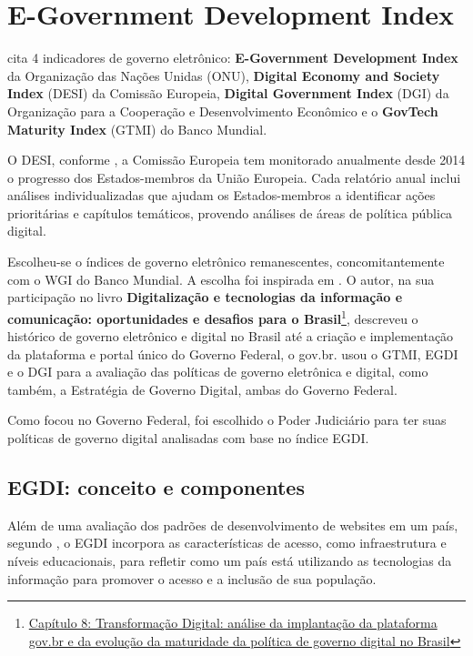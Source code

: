 \chapter{E-Government Development Index}

\cite{martinez2022egovernment} cita 4 indicadores de governo eletrônico: \textbf{E-Government Development Index} da Organização das Nações Unidas (ONU), \textbf{Digital Economy and Society Index} (DESI) da Comissão Europeia, \textbf{Digital Government Index} (DGI) da Organização para a Cooperação e Desenvolvimento Econômico e o \textbf{GovTech Maturity Index} (GTMI) do Banco Mundial.

O DESI, conforme \cite{desi_2022}, a Comissão Europeia tem monitorado anualmente desde 2014 o progresso dos Estados-membros da União Europeia. Cada relatório anual inclui análises individualizadas que ajudam os Estados-membros a identificar ações prioritárias e capítulos temáticos, provendo análises de áreas de política pública digital.

Escolheu-se o índices de governo eletrônico remanescentes, concomitantemente com o WGI do Banco Mundial. A escolha foi inspirada em \cite{mitkiewicz2024transformaccao}. O autor, na sua participação no livro \textbf{Digitalização e tecnologias da informação e comunicação: oportunidades e desafios para o Brasil}\footnote{\href{http://dx.doi.org/10.38116/9786556350660cap8}{Capítulo 8: Transformação Digital: análise da implantação da plataforma gov.br e da evolução da maturidade da política de governo digital no Brasil}}, descreveu o histórico de governo eletrônico e digital no Brasil até a criação e implementação da plataforma e portal único do Governo Federal, o gov.br. \cite{mitkiewicz2024transformaccao} usou o GTMI, EGDI e o DGI para a avaliação das políticas de governo eletrônica e digital, como também, a Estratégia de Governo Digital, ambas do Governo Federal.

Como \cite{mitkiewicz2024transformaccao} focou no Governo Federal, foi escolhido o Poder Judiciário para ter suas políticas de governo digital analisadas com base no índice EGDI.

\section{EGDI: conceito e componentes}

Além de uma avaliação dos padrões de desenvolvimento de websites em um país, segundo \cite{ONU_EGDI_description}, o EGDI incorpora as características de acesso, como infraestrutura e níveis educacionais, para refletir como um país está utilizando as tecnologias da informação para promover o acesso e a inclusão de sua população. 

